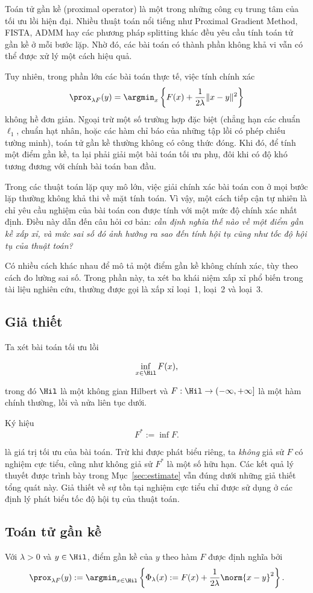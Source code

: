Toán tử gần kề (proximal operator) là một trong những công cụ trung tâm của tối ưu lồi hiện đại. Nhiều thuật toán nổi tiếng như Proximal Gradient Method, FISTA, ADMM hay các phương pháp splitting khác đều yêu cầu tính toán tử gần kề ở mỗi bước lặp. Nhờ đó, các bài toán có thành phần không khả vi vẫn có thể được xử lý một cách hiệu quả.

Tuy nhiên, trong phần lớn các bài toán thực tế, việc tính chính xác
\[
\prox_{\lambda F}(y)
=
\argmin_x
\left\{
F(x)+\frac1{2\lambda}\|x-y\|^2
\right\}
\]
không hề đơn giản. Ngoại trừ một số trường hợp đặc biệt (chẳng hạn các chuẩn $\ell_1$, chuẩn hạt nhân, hoặc các hàm chỉ báo của những tập lồi có phép chiếu tường minh), toán tử gần kề thường không có công thức đóng. Khi đó, để tính một điểm gần kề, ta lại phải giải một bài toán tối ưu phụ, đôi khi có độ khó tương đương với chính bài toán ban đầu.

Trong các thuật toán lặp quy mô lớn, việc giải chính xác bài toán con ở mọi bước lặp thường không khả thi về mặt tính toán. Vì vậy, một cách tiếp cận tự nhiên là chỉ yêu cầu nghiệm của bài toán con được tính với một mức độ chính xác nhất định. Điều này dẫn đến câu hỏi cơ bản: \emph{cần định nghĩa thế nào về một điểm gần kề xấp xỉ, và mức sai số đó ảnh hưởng ra sao đến tính hội tụ cũng như tốc độ hội tụ của thuật toán?}

Có nhiều cách khác nhau để mô tả một điểm gần kề không chính xác, tùy theo cách đo lường sai số. Trong phần này, ta xét ba khái niệm xấp xỉ phổ biến trong tài liệu nghiên cứu, thường được gọi là xấp xỉ loại~1, loại~2 và loại~3. 
\subsection{Giả thiết}
Ta xét bài toán tối ưu lồi

$$\inf_{x\in\Hil}F(x),$$

trong đó $\Hil$ là một không gian Hilbert và $F:\Hil\to(-\infty,+\infty]$ là một hàm chính thường, lồi và nửa liên tục dưới.

Ký hiệu $$F^*:=\inf F.$$

là giá trị tối ưu của bài toán. Trừ khi được phát biểu riêng, ta \emph{không} giả sử $F$ có nghiệm cực tiểu, cũng như không giả sử $F^*$ là một số hữu hạn. Các kết quả lý thuyết được trình bày trong Mục~\ref{sec:estimate} vẫn đúng dưới những giả thiết tổng quát này. Giả thiết về sự tồn tại nghiệm cực tiểu chỉ được sử dụng ở các định lý phát biểu tốc độ hội tụ của thuật toán.

\subsection{Toán tử gần kề}
\begin{definition}
Với $\lambda>0$ và $y\in\Hil$, điểm gần kề của $y$ theo hàm $F$ được định nghĩa bởi
\begin{equation}
    \prox_{\lambda F}(y)
    :=
    \argmin_{x\in\Hil}
    \left\{
    \Phi_\lambda(x)
    :=
    F(x)
    +
    \frac1{2\lambda}\norm{x-y}^2
    \right\}.
\end{equation}
\end{definition}

